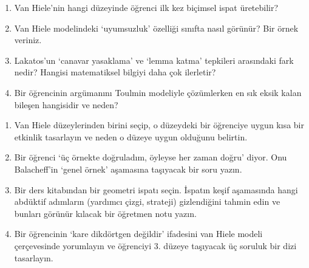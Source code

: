 
\begin{enumerate}[leftmargin=1.8em,label=\textbf{\arabic*.}]
\item Van Hiele’nin hangi düzeyinde öğrenci ilk kez biçimsel ispat üretebilir?
\item Van Hiele modelindeki ‘uyumsuzluk’ özelliği sınıfta nasıl görünür? Bir örnek veriniz.
\item Lakatos’un ‘canavar yasaklama’ ve ‘lemma katma’ tepkileri arasındaki fark nedir? Hangisi matematiksel bilgiyi daha çok ilerletir?
\item Bir öğrencinin argümanını Toulmin modeliyle çözümlerken en sık eksik kalan bileşen hangisidir ve neden?
\end{enumerate}


\begin{enumerate}[leftmargin=1.8em,label=\textbf{\arabic*.}]
\item Van Hiele düzeylerinden birini seçip, o düzeydeki bir öğrenciye uygun kısa bir etkinlik tasarlayın ve neden o düzeye uygun olduğunu belirtin.
\item Bir öğrenci ‘üç örnekte doğruladım, öyleyse her zaman doğru’ diyor. Onu Balacheff’in ‘genel örnek’ aşamasına taşıyacak bir soru yazın.
\item Bir ders kitabından bir geometri ispatı seçin. İspatın keşif aşamasında hangi abdüktif adımların (yardımcı çizgi, strateji) gizlendiğini tahmin edin ve bunları görünür kılacak bir öğretmen notu yazın.
\item Bir öğrencinin ‘kare dikdörtgen değildir’ ifadesini van Hiele modeli çerçevesinde yorumlayın ve öğrenciyi 3. düzeye taşıyacak üç soruluk bir dizi tasarlayın.
\end{enumerate}


